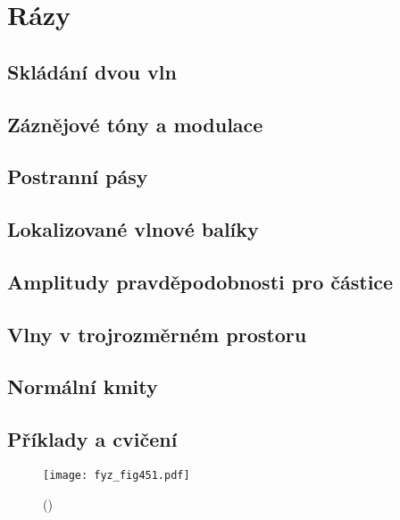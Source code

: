 \chapter{Rázy}\label{fyz:IchapXLVIII}
\minitoc
  \section{Skládání dvou vln}\label{fyz:IchapXLVIIIsecI}
  \section{Záznějové tóny a modulace}\label{fyz:IchapXLVIIIsecII}
  \section{Postranní pásy}\label{fyz:IchapXLVIIIsecIII}
  \section{Lokalizované vlnové balíky}\label{fyz:IchapXLVIIIsecIV}
  \section{Amplitudy pravděpodobnosti pro částice}\label{fyz:IchapXLVIIIsecV}
  \section{Vlny v trojrozměrném prostoru}\label{fyz:IchapXLVIIIsecVI}
  \section{Normální kmity}\label{fyz:IchapXLVIIIsecVII}
  \section{Příklady a cvičení}\label{fyz:IchapXLVIIIsecVIII}

    \begin{figure}[ht!] %
      \centering
      \texttt{[image: fyz\_fig451.pdf]}
      \caption{ 
               (\cite[s.~707]{Feynman01})}
      \label{fyz_fig451}
    \end{figure}
    
